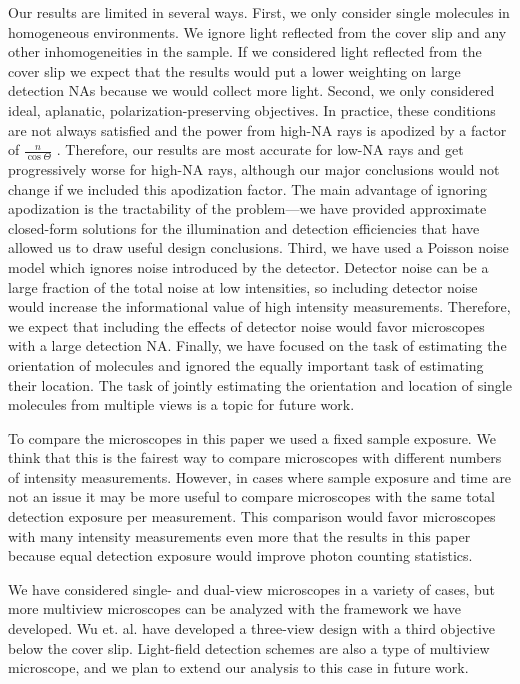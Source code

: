 \documentclass[10pt]{article}
\begin{document}
Our results are limited in several ways. First, we only consider single
molecules in homogeneous environments. We ignore light reflected from the cover
slip and any other inhomogeneities in the sample. If we considered light
reflected from the cover slip we expect that the results would put a lower
weighting on large detection NAs because we would collect more light. Second, we
only considered ideal, aplanatic, polarization-preserving objectives. In
practice, these conditions are not always satisfied and the power from high-NA
rays is apodized by a factor of $\frac{n}{\cos\Theta}$
\cite{nov2006}. Therefore, our results are most accurate for low-NA rays and get
progressively worse for high-NA rays, although our major conclusions would not
change if we included this apodization factor. The main advantage of ignoring
apodization is the tractability of the problem---we have provided approximate
closed-form solutions for the illumination and detection efficiencies that have
allowed us to draw useful design conclusions. Third, we have used a Poisson
noise model which ignores noise introduced by the detector. Detector noise can
be a large fraction of the total noise at low intensities, so including detector
noise would increase the informational value of high intensity
measurements. Therefore, we expect that including the effects of detector noise
would favor microscopes with a large detection NA. Finally, we have focused on
the task of estimating the orientation of molecules and ignored the equally
important task of estimating their location. The task of jointly estimating the
orientation and location of single molecules from multiple views is a topic for
future work.

To compare the microscopes in this paper we used a fixed sample exposure. We
think that this is the fairest way to compare microscopes with different numbers
of intensity measurements. However, in cases where sample exposure and time are
not an issue it may be more useful to compare microscopes with the same total
detection exposure per measurement. This comparison would favor microscopes with
many intensity measurements even more that the results in this paper because
equal detection exposure would improve photon counting statistics.

We have considered single- and dual-view microscopes in a variety of cases, but
more multiview microscopes can be analyzed with the framework we have
developed. Wu et. al. have developed a three-view design with a third objective
below the cover slip\cite{wu2016}. Light-field detection schemes are also a type
of multiview microscope\cite{levoy2006}, and we plan to extend our analysis to
this case in future work.
\end{document}
